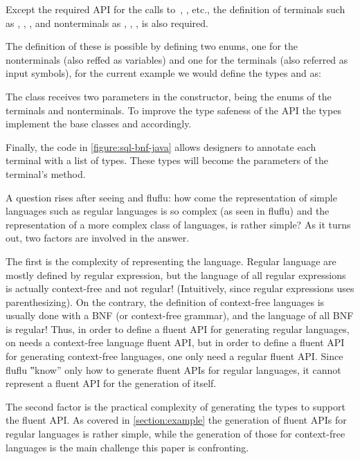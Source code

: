 Except the required API for the calls to~,
  ,  etc., the definition of terminals such as
  , , , and nonterminals as ,
  , , is also required.

The definition of these is possible by defining two \Java enums, one for the
nonterminals (also reffed as variables) and one for the terminals (also
referred as input symbols), for the current example we would define the types
 and  as:

\begin{quote}
  \parbox[c]{43ex}{}
\end{quote}


The  class receives two parameters in the constructor, being the enums
  of the terminals and nonterminals.
To improve the type safeness of the API the types implement the base classes
   and  accordingly.

Finally, the code in \cref{figure:sql-bnf-java} allows designers to annotate
  each terminal with a list of types.
These types will become the parameters of the terminal's method.

A question rises after seeing \Fajita and fluflu: how come the representation
of simple languages such as regular languages is so complex (as seen in fluflu)
and the representation of a more complex class of languages, is rather simple?
As it turns out, two factors are involved in the answer.

The first is the complexity of representing the language.
Regular language are mostly defined by regular expression, but the language of
  all regular expressions is actually context-free and not regular!
  (Intuitively, since regular expressions uses parenthesizing). On the contrary,
  the definition of context-free languages is usually done with a BNF (or
  context-free grammar), and the language of all BNF is regular!
Thus, in order to define a fluent API for generating regular languages, on needs a
  context-free language fluent API, but in order to define a fluent API for
  generating context-free languages, one only need a regular fluent API.
Since fluflu ‟know” only how to generate fluent APIs for regular languages,
  it cannot represent a fluent API for the generation of itself.

The second factor is the practical complexity of generating the \Java types to
support the fluent API. As covered in \cref{section:example} the generation of
fluent APIs for regular languages is rather simple, while the generation of
those for context-free languages is the main challenge this paper is
confronting.

